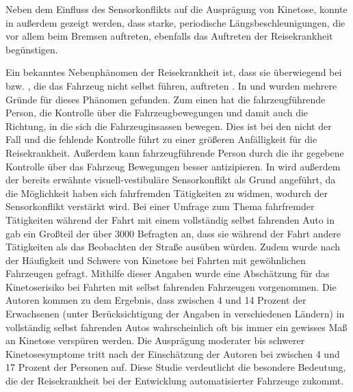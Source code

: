 Neben dem Einfluss des Sensorkonflikts auf die Ausprägung von Kinetose, konnte in \cite{Vogel.1982} außerdem gezeigt werden, dass starke, periodische Längsbeschleunigungen, die vor allem beim Bremsen auftreten, ebenfalls das Auftreten der Reisekrankheit begünstigen. 

Ein bekanntes Nebenphänomen der Reisekrankheit ist, dass sie überwiegend bei  bzw. , die das Fahrzeug nicht selbst führen, auftreten \cite{Reason.1975}. In \cite{Sivak.2015} und \cite{Rolnick.1991} wurden mehrere Gründe für dieses Phänomen gefunden. Zum einen hat die fahrzeugführende Person, die Kontrolle über die Fahrzeugbewegungen und damit auch die Richtung, in die sich die Fahrzeuginsassen bewegen. Dies ist bei den  nicht der Fall und die fehlende Kontrolle führt zu einer größeren Anfälligkeit für die Reisekrankheit. Außerdem kann fahrzeugführende Person durch die ihr gegebene Kontrolle über das Fahrzeug Bewegungen besser antizipieren. In \cite{Sivak.2015} wird außerdem der bereits erwähnte visuell-vestibuläre Sensorkonflikt als Grund angeführt, da  die Möglichkeit haben sich fahrfremden Tätigkeiten zu widmen, wodurch der Sensorkonflikt verstärkt wird. Bei einer Umfrage zum Thema fahrfremder Tätigkeiten während der Fahrt mit einem vollständig selbst fahrenden Auto in \cite{Sivak.2015} gab ein Großteil der über 3000 Befragten an, dass sie während der Fahrt andere Tätigkeiten als das Beobachten der Straße ausüben würden. Zudem wurde nach der Häufigkeit und Schwere von Kinetose bei Fahrten mit gewöhnlichen Fahrzeugen gefragt. Mithilfe dieser Angaben wurde eine Abschätzung für das Kinetoserisiko bei Fahrten mit selbst fahrenden Fahrzeugen vorgenommen. Die Autoren kommen zu dem Ergebnis, dass zwischen 4 und 14 Prozent der Erwachsenen (unter Berücksichtigung der Angaben in verschiedenen Ländern) in vollständig selbst fahrenden Autos wahrscheinlich oft bis immer ein gewisses Maß an Kinetose verspüren werden. Die Ausprägung moderater bis schwerer Kinetosesymptome tritt nach der Einschätzung der Autoren bei zwischen 4 und 17 Prozent der Personen auf. Diese Studie verdeutlicht die besondere Bedeutung, die der Reisekrankheit bei der Entwicklung automatisierter Fahrzeuge zukommt. 

